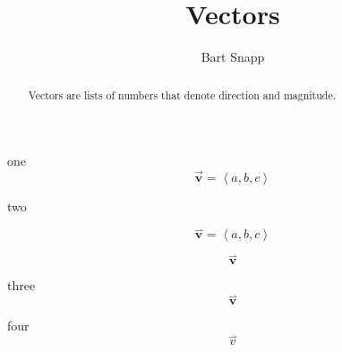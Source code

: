 \documentclass{ximera}
\author{Bart Snapp}
\title[Dig-In:]{Vectors}
\begin{document}
\begin{abstract}
  Vectors are lists of numbers that denote direction and magnitude.
\end{abstract}
\maketitle




one
\[ \mathbf{\vec{v}} = \left\langle a,b,c \right\rangle   \]





two

\[ \overset{\rightharpoonup}{\mathbf{v}} = \left\langle a,b,c \right\rangle   \]



\[ {{\overset{\boldsymbol{\rightharpoonup}}{\mathbf{v}}}}  \]

three
\[ {\overset{\boldsymbol{\rightharpoonup}}{\mathbf{v}}}  \]

four
\[ {{\overset{\boldsymbol{\rightharpoonup}}{v}}} \]
\end{document}
